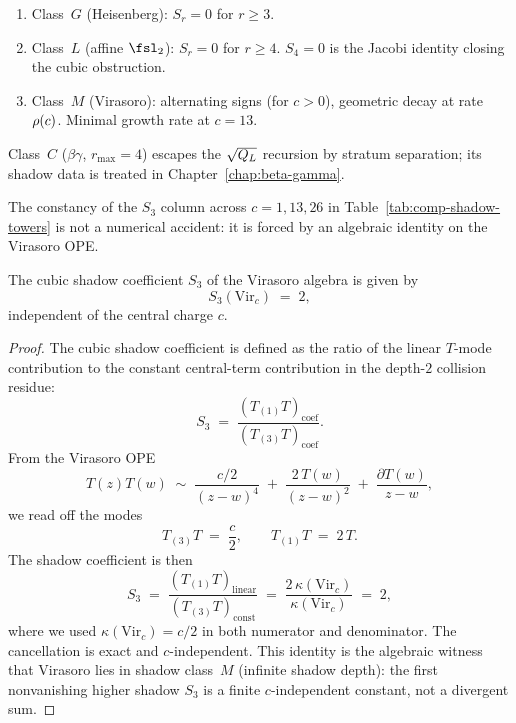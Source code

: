 \begin{remark}
\label{rem:comp-shadow-table-structure}
\begin{enumerate}[label=\textup{(\roman*)}]
\item Class~$G$ (Heisenberg): $S_r = 0$ for $r \geq 3$.
\item Class~$L$ (affine $\fsl_2$): $S_r = 0$ for $r \geq 4$.
 $S_4 = 0$ is the Jacobi identity closing the cubic
 obstruction.
\item Class~$M$ (Virasoro): alternating signs (for $c > 0$),
 geometric decay at rate~$\rho(c)$. Minimal
 growth rate at $c = 13$.
\end{enumerate}
Class~$C$ ($\beta\gamma$, $r_{\max} = 4$) escapes the
$\sqrt{Q_L}$ recursion by stratum separation; its
shadow data is treated in Chapter~\ref{chap:beta-gamma}.
\end{remark}

The constancy of the $S_3$ column across $c = 1, 13, 26$ in
Table~\ref{tab:comp-shadow-towers} is not a numerical accident:
it is forced by an algebraic identity on the Virasoro OPE.

\begin{theorem}
\label{thm:s3-virasoro-c-independent}
The cubic shadow coefficient $S_3$ of the Virasoro algebra is
given by
\[
 S_3(\mathrm{Vir}_c) \;=\; 2,
\]
independent of the central charge $c$.
\end{theorem}

\begin{proof}
The cubic shadow coefficient is defined as the ratio of the
linear $T$-mode contribution to the constant central-term
contribution in the depth-$2$ collision residue:
\[
 S_3 \;=\;
 \frac{(T_{(1)}T)_{\mathrm{coef}}}{(T_{(3)}T)_{\mathrm{coef}}}.
\]
From the Virasoro OPE
\[
 T(z)T(w) \;\sim\; \frac{c/2}{(z-w)^{4}}
 \;+\; \frac{2\,T(w)}{(z-w)^{2}}
 \;+\; \frac{\partial T(w)}{z-w},
\]
we read off the modes
\[
 T_{(3)} T \;=\; \frac{c}{2},
 \qquad
 T_{(1)} T \;=\; 2\,T.
\]
The shadow coefficient is then
\[
 S_3 \;=\; \frac{(T_{(1)}T)_{\mathrm{linear}}}
 {(T_{(3)}T)_{\mathrm{const}}}
 \;=\; \frac{2\,\kappa(\mathrm{Vir}_c)}{\kappa(\mathrm{Vir}_c)}
 \;=\; 2,
\]
where we used $\kappa(\mathrm{Vir}_c) = c/2$ in both numerator
and denominator. The cancellation is exact and
$c$-independent. This identity is the algebraic witness that
Virasoro lies in shadow class~$M$ (infinite shadow depth): the
first nonvanishing higher shadow $S_3$ is a finite
$c$-independent constant, not a divergent sum.
\end{proof}

